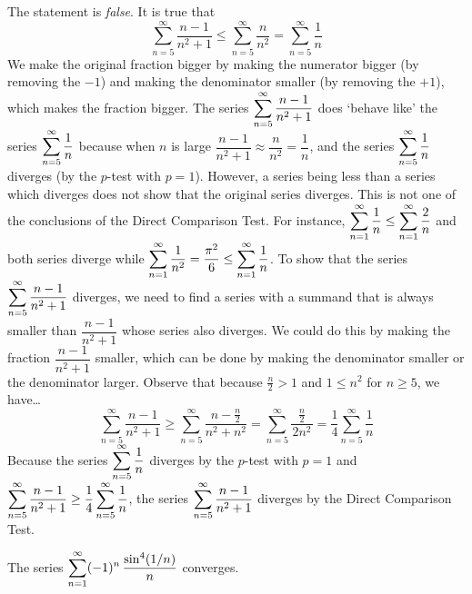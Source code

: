 \documentclass[11pt,letterpaper]{article}
\begin{document}
\sol The statement is \textit{false}. It is true that 
	\[
	\sum_{n=5}^\infty \dfrac{n - 1}{n^2 + 1} \leq \sum_{n=5}^\infty \dfrac{n}{n^2}= \sum_{n=5}^\infty \dfrac{1}{n}
	\]
We make the original fraction bigger by making the numerator bigger (by removing the $-1$) and making the denominator smaller (by removing the $+1$), which makes the fraction bigger. The series $\displaystyle\sum_{n=5}^\infty \dfrac{n - 1}{n^2 + 1}$ does `behave like' the series $\displaystyle\sum_{n=5}^\infty \dfrac{1}{n}$ because when $n$ is large $\dfrac{n - 1}{n^2 + 1} \approx \dfrac{n}{n^2}= \dfrac{1}{n}$, and the series $\displaystyle\sum_{n=5}^\infty \dfrac{1}{n}$ diverges (by the $p$-test with $p= 1$). However, a series being less than a series which diverges does not show that the original series diverges. This is not one of the conclusions of the Direct Comparison Test. For instance, $\displaystyle\sum_{n=1}^\infty \dfrac{1}{n} \leq \sum_{n=1}^\infty \dfrac{2}{n}$ and both series diverge while $\displaystyle\sum_{n=1}^\infty \dfrac{1}{n^2}= \dfrac{\pi^2}{6} \leq \sum_{n=1}^\infty \dfrac{1}{n}$. To show that the series $\displaystyle\sum_{n=5}^\infty \dfrac{n - 1}{n^2 + 1}$ diverges, we need to find a series with a summand that is always smaller than $\dfrac{n - 1}{n^2 + 1}$ whose series also diverges. We could do this by making the fraction $\dfrac{n - 1}{n^2 + 1}$ smaller, which can be done by making the denominator smaller or the denominator larger. Observe that because $\frac{n}{2} > 1$ and $1 \leq n^2$ for $n \geq 5$, we have\dots
	\[
	\sum_{n=5}^\infty \dfrac{n - 1}{n^2 + 1} \geq \sum_{n=5}^\infty \dfrac{n - \frac{n}{2}}{n^2 + n^2}= \sum_{n=5}^\infty \dfrac{\;\;\frac{n}{2}\;\;}{2n^2}= \dfrac{1}{4} \sum_{n=5}^\infty \dfrac{1}{n}
	\]
Because the series $\displaystyle\sum_{n=5}^\infty \dfrac{1}{n}$ diverges by the $p$-test with $p= 1$ and $\displaystyle\sum_{n=5}^\infty \dfrac{n - 1}{n^2 + 1} \geq \dfrac{1}{4} \sum_{n=5}^\infty \dfrac{1}{n}$, the series $\displaystyle\sum_{n=5}^\infty \dfrac{n - 1}{n^2 + 1}$ diverges by the Direct Comparison Test. 





\newpage





 The series $\displaystyle\sum_{n=1}^\infty (-1)^n\, \dfrac{\sin^4(1/n)}{n}$ converges. \pspace
\end{document}
